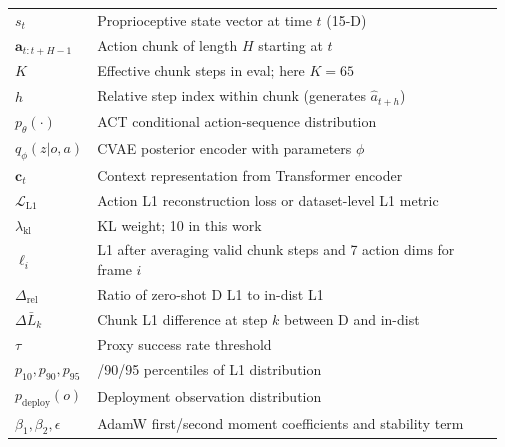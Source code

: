 \documentclass[10pt,twocolumn,letterpaper]{article}
\begin{document}
\begin{table}[H]
\begin{tabular}{@{}>{\raggedright\arraybackslash}p{0.12\linewidth}>{\raggedright\arraybackslash}p{0.85\linewidth}@{}}
    $s_t$ & Proprioceptive state vector at time $t$ (15-D) \\
    $\mathbf{a}_{t:t+H-1}$ & Action chunk of length $H$ starting at $t$ \\
    $K$ & Effective chunk steps in eval; here $K{=}65$ \\
    $h$ & Relative step index within chunk (generates $\hat{a}_{t+h}$) \\
    $p_\theta(\cdot)$ & ACT conditional action-sequence distribution \\
    $q_\phi(z|o,a)$ & CVAE posterior encoder with parameters $\phi$ \\
    $\mathbf{c}_t$ & Context representation from Transformer encoder \\
    $\mathcal{L}_{\mathrm{L1}}$ & Action L1 reconstruction loss or dataset-level L1 metric \\
    $\lambda_{\mathrm{kl}}$ & KL weight; 10 in this work \\
    $\ell_i$ & L1 after averaging valid chunk steps and 7 action dims for frame $i$ \\
    $\Delta_{\mathrm{rel}}$ & Ratio of zero-shot D L1 to in-dist L1 \\
    $\Delta\bar{L}_k$ & Chunk L1 difference at step $k$ between D and in-dist \\
    $\tau$ & Proxy success rate threshold \\
    $p_{10},p_{90},p_{95}$ & 10/90/95 percentiles of L1 distribution \\
    $p_{\mathrm{deploy}}(o)$ & Deployment observation distribution \\
    $\beta_1,\beta_2,\epsilon$ & AdamW first/second moment coefficients and stability term \\
    \bottomrule
  \end{tabular}
\end{table}
\end{document}
